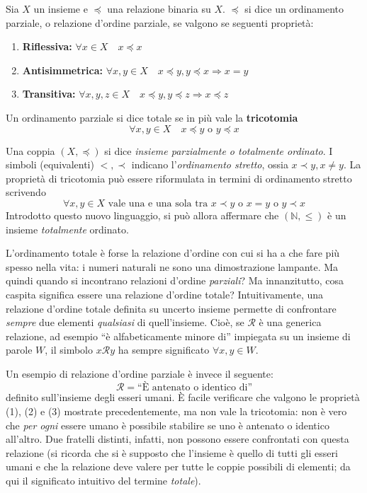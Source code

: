\documentclass[oneside]{book}
\theoremstyle{remark}
\begin{document}
\begin{tcolorbox}[colback=yellow!30, colframe=yellow!30!black, title={Relazione d'ordine parziale e totale}]
Sia $X$ un insieme e $\preceq$ una relazione binaria su
$X$. $\preceq$ si dice un ordinamento parziale, o relazione
d'ordine parziale, se valgono se seguenti proprietà:
\begin{enumerate}
    \item \textbf{Riflessiva:} $\forall x\in X \quad x\preceq x$
    \item \textbf{Antisimmetrica:} $\forall x,y\in X \quad x\preceq y, y\preceq x \Longrightarrow x = y$
    \item \textbf{Transitiva:} $\forall x,y,z\in X \quad x\preceq y, y\preceq z \Longrightarrow x\preceq z$
\end{enumerate}
Un ordinamento parziale si dice totale se in più vale la \textbf{tricotomia}
\[ \forall x,y\in X \quad x\preceq y \text{ o } y\preceq x \]
\end{tcolorbox}
Una coppia $(X,\preceq)$ si dice \textit{insieme parzialmente o totalmente
ordinato}.
I simboli (equivalenti) $<,\prec$ indicano l'\textit{ordinamento stretto}, ossia
$x\prec y, x\not=y$. La proprietà di tricotomia può essere riformulata
in termini di ordinamento stretto scrivendo
\[ \forall x,y\in X \text{ vale una e una sola tra } x\prec y \text{ o } x=y \text{ o } y\prec x \]
Introdotto questo nuovo linguaggio, si può allora affermare che
$(\mathbb{N},\leq)$ è un insieme \textit{totalmente} ordinato.

L'ordinamento totale è forse la relazione d'ordine con cui si ha a che
fare più spesso nella vita: i numeri naturali ne sono una dimostrazione
lampante. Ma quindi quando si incontrano relazioni d'ordine \textit{parziali}?
Ma innanzitutto, cosa caspita significa essere una relazione d'ordine totale? Intuitivamente,
una relazione d'ordine totale definita su uncerto insieme permette di
confrontare \textit{sempre} due elementi \textit{qualsiasi} di
quell'insieme. Cioè, se $\mathcal{R}$ è una generica relazione, ad esempio
``è alfabeticamente minore di'' impiegata su un insieme di parole $W$,
il simbolo $x\mathcal{R}y$ ha sempre significato $\forall x,y\in W$.

Un esempio di relazione d'ordine parziale è invece il seguente:
\[ \mathcal{R} = \text{``È antenato o identico di''} \]
definito sull'insieme degli esseri umani. È facile verificare che
valgono le proprietà (1), (2) e (3) mostrate precedentemente, ma
non vale la tricotomia: non è vero che \textit{per ogni} essere
umano è possibile stabilire se uno è antenato o identico all'altro.
Due fratelli distinti, infatti, non possono essere confrontati con questa
relazione (si ricorda che si è supposto che l'insieme è quello di tutti
gli esseri umani e che la relazione deve valere per tutte le coppie
possibili di elementi; da qui il significato intuitivo del termine
\textit{totale}).
\end{document}
